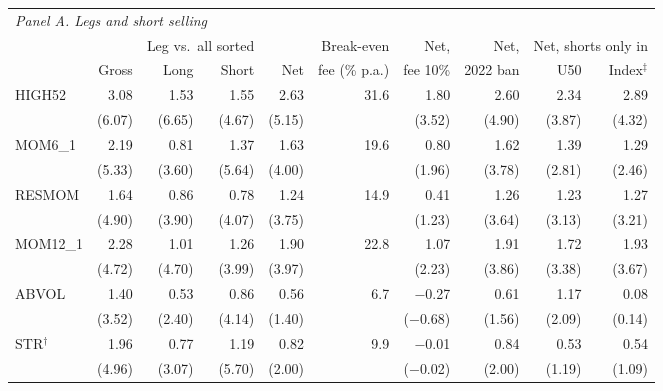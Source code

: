\begin{tabular}{l rrr r r r r rr}
\toprule
\multicolumn{10}{l}{\emph{Panel A. Legs and short selling}} \\
 & & \multicolumn{2}{c}{Leg vs.\ all sorted} & & Break-even & Net, & Net, & \multicolumn{2}{c}{Net, shorts only in} \\
\cmidrule(lr){3-4}\cmidrule(lr){9-10}
 & Gross & Long & Short & Net & fee (\% p.a.) & fee 10\% & 2022 ban & U50 & Index$^{\ddagger}$ \\
\midrule
HIGH52 & 3.08 & 1.53 & 1.55 & 2.63 & 31.6 & 1.80 & 2.60 & 2.34 & 2.89 \\
 & (6.07) & (6.65) & (4.67) & (5.15) &  & (3.52) & (4.90) & (3.87) & (4.32) \\[1pt]
MOM6\_1 & 2.19 & 0.81 & 1.37 & 1.63 & 19.6 & 0.80 & 1.62 & 1.39 & 1.29 \\
 & (5.33) & (3.60) & (5.64) & (4.00) &  & (1.96) & (3.78) & (2.81) & (2.46) \\[1pt]
RESMOM & 1.64 & 0.86 & 0.78 & 1.24 & 14.9 & 0.41 & 1.26 & 1.23 & 1.27 \\
 & (4.90) & (3.90) & (4.07) & (3.75) &  & (1.23) & (3.64) & (3.13) & (3.21) \\[1pt]
MOM12\_1 & 2.28 & 1.01 & 1.26 & 1.90 & 22.8 & 1.07 & 1.91 & 1.72 & 1.93 \\
 & (4.72) & (4.70) & (3.99) & (3.97) &  & (2.23) & (3.86) & (3.38) & (3.67) \\[1pt]
ABVOL & 1.40 & 0.53 & 0.86 & 0.56 & 6.7 & $-$0.27 & 0.61 & 1.17 & 0.08 \\
 & (3.52) & (2.40) & (4.14) & (1.40) &  & ($-$0.68) & (1.56) & (2.09) & (0.14) \\[1pt]
STR$^{\dagger}$ & 1.96 & 0.77 & 1.19 & 0.82 & 9.9 & $-$0.01 & 0.84 & 0.53 & 0.54 \\
 & (4.96) & (3.07) & (5.70) & (2.00) &  & ($-$0.02) & (2.00) & (1.19) & (1.09) \\[1pt]
\bottomrule
\end{tabular}
